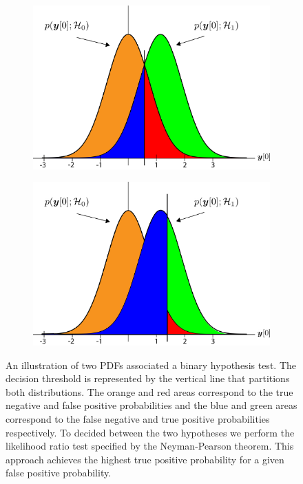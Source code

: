\begin{figure}[htbp]
    \centering
    \begin{subfigure}{0.48\textwidth}
        \includegraphics[width=\textwidth]{figs/Chapter-4/230523_detection_theory.png}
        \caption{}
    \end{subfigure}
    \hfill
    \begin{subfigure}{0.48\textwidth}
        \includegraphics[width=\textwidth]{figs/Chapter-4/230523_detection_theory2.png}
        \caption{}
    \end{subfigure}
    \caption{An illustration of two PDFs associated a binary hypothesis test. The decision threshold is represented by the vertical line that partitions both distributions. The orange and red areas correspond to the true negative and false positive probabilities and the blue and green areas correspond to the false negative and true positive probabilities respectively. To decided between the two hypotheses we perform the likelihood ratio test specified by the Neyman-Pearson theorem. This approach achieves the highest true positive probability for a given false positive probability.}
    \label{fig:chap4-detection-threshold}
\end{figure}
